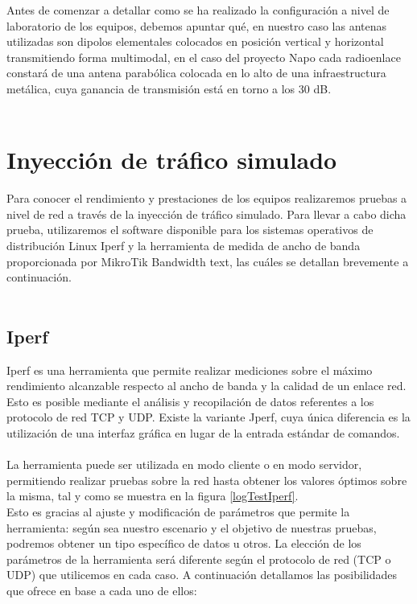Antes de comenzar a detallar como se ha realizado la configuración a nivel de laboratorio de los equipos, debemos apuntar qué, en nuestro caso las antenas utilizadas son dipolos elementales colocados en posición vertical y horizontal transmitiendo forma multimodal, en el caso del proyecto Napo cada radioenlace constará de una antena parabólica colocada en lo alto de una infraestructura metálica, cuya ganancia de transmisión está en torno a los 30 dB. \\\\

\section{Inyección de tráfico simulado}
Para conocer el rendimiento y prestaciones de los equipos realizaremos pruebas a nivel de red a través de la inyección de tráfico simulado. Para llevar a cabo dicha prueba, utilizaremos el software disponible para los sistemas operativos de distribución Linux Iperf y la herramienta de medida de ancho de banda proporcionada por MikroTik Bandwidth text, las cuáles se detallan brevemente a continuación.\\\\

\subsection{Iperf}
Iperf \cite{Iperf} es una herramienta que permite realizar mediciones sobre el máximo rendimiento alcanzable respecto al ancho de banda y la calidad de un enlace red. Esto es posible mediante el análisis y recopilación de datos referentes a los protocolo de red TCP y UDP. Existe la variante Jperf, cuya única diferencia es la utilización de una interfaz gráfica en lugar de la entrada estándar de comandos.\\\\

La herramienta puede ser utilizada en modo cliente o en modo servidor, permitiendo realizar pruebas sobre la red hasta obtener los valores óptimos sobre la misma, tal y como se muestra en la figura \ref{logTestIperf}.\\
Esto es gracias al ajuste y modificación de parámetros que permite la herramienta: según sea nuestro escenario y el objetivo de nuestras pruebas, podremos obtener un tipo específico de datos u otros. La elección de los parámetros de la herramienta será diferente según el protocolo de red (TCP o UDP) que utilicemos en cada caso. A continuación detallamos las posibilidades que ofrece en base a cada uno de ellos:\\\\

